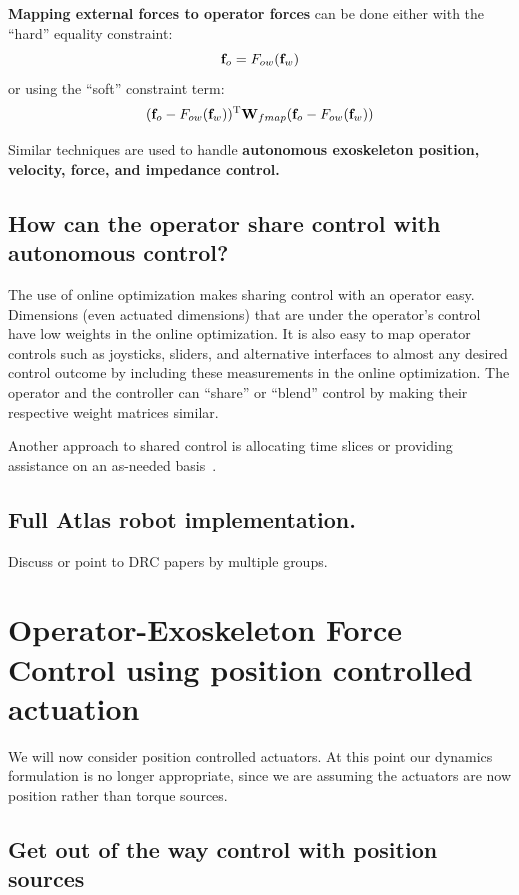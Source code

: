 \documentclass[letterpaper,12pt,fullpage]{article}
\begin{document}
{\bf Mapping external forces to operator forces} can be done either with the
``hard'' equality constraint:
\begin{equation}
{\bf f}_o = F_{ow} ( {\bf f}_w )
\end{equation}
or using the ``soft'' constraint term:
\begin{equation}
({\bf f}_o - F_{ow} ( {\bf f}_w ))^{\rm T} {\bf W}_{fmap}  ({\bf f}_o - F_{ow} ( {\bf f}_w ))
\end{equation}

Similar techniques are used to handle {\bf autonomous exoskeleton position, velocity,
force, and impedance control.}

\subsection{How can the operator share control with autonomous control?}

The use of online optimization makes sharing control with an operator easy.
Dimensions (even actuated dimensions) that are under the operator's control have
low weights in the online optimization. It is also easy to map operator controls
such as joysticks, sliders, and alternative interfaces to almost any desired
control outcome by including these measurements in the online optimization.
The operator and the controller can ``share'' or ``blend''
control by making their respective
weight matrices similar.

Another approach to shared control is allocating time slices or providing assistance
on an as-needed basis~\cite{IEEE07140030}.

\subsection{Full Atlas robot implementation.}

Discuss or point to DRC papers by multiple groups.

\section{Operator-Exoskeleton Force Control using position controlled actuation}

We will now consider position controlled actuators.
At this point our dynamics formulation is no longer appropriate, since we
are assuming the actuators are now position rather than torque sources.

\subsection{Get out of the way control with position sources}
\end{document}
